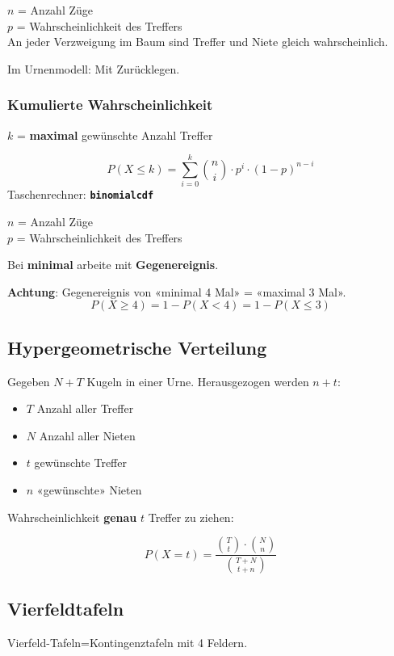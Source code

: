 \begin{multicols}{2}
\begin{tcolorbox}[colback=white]
$n$ = Anzahl Züge\\
$p$ = Wahrscheinlichkeit des Treffers\\

An jeder Verzweigung im Baum sind Treffer und Niete gleich
wahrscheinlich.

Im Urnenmodell: Mit Zurücklegen.
\end{tcolorbox}

\subsubsection*{Kumulierte Wahrscheinlichkeit}

\begin{tcolorbox}[colback=white]

$k$ = \textbf{maximal} gewünschte Anzahl Treffer


$$P(X\le k) = \sum_{i=0}^{k}{n \choose i}\cdot{}p^i\cdot{}(1-p)^{n-i}$$
Taschenrechner: \textbf{\texttt{binomialcdf}}

$n$ = Anzahl Züge\\
$p$ = Wahrscheinlichkeit des Treffers\\
\end{tcolorbox}


Bei \textbf{minimal} arbeite mit \textbf{Gegenereignis}.

\textbf{Achtung}: Gegenereignis von «minimal 4 Mal» = «maximal 3 Mal».
$$P(X \ge 4) = 1 - P(X < 4) = 1-P(X\le 3)$$

\forceCB
\subsection*{Hypergeometrische Verteilung}
Gegeben $N+T$ Kugeln in einer Urne. Herausgezogen werden $n+t$:
\begin{itemize}
\item $T$ Anzahl aller Treffer
\item $N$ Anzahl aller Nieten
\item $t$ gewünschte Treffer
\item $n$ «gewünschte» Nieten
\end{itemize}
Wahrscheinlichkeit \textbf{genau} $t$ Treffer zu ziehen:

$$P(X=t) = \frac{ {T \choose t} \cdot {N  \choose n} }{{T+N \choose t+n}}$$


\subsection*{Vierfeldtafeln}
Vierfeld-Tafeln=Kontingenztafeln mit 4 Feldern.


\end{multicols}
